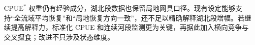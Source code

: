 $\mathrm{CPUE}^*$ 权重仍有经验成分，湖北段数据也保留局地网具口径。现有设定能够支持“全流域平均恢复”和“局地恢复方向一致”，还不足以精确解释湖北段增幅。若继续提高解释力，标准化 CPUE 和连续河段监测更为关键，再据此加入横向竞争与交叉摄食；改进不只涉及状态维度。
